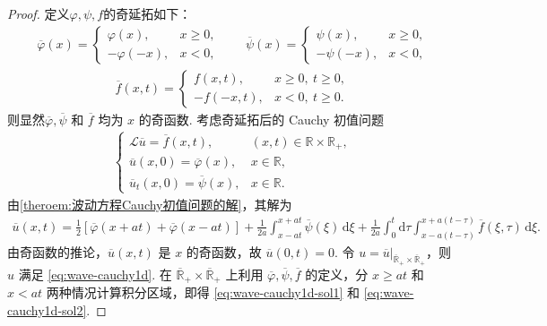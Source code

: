 \documentclass[../../main.tex]{subfiles}%
\begin{document}
\begin{proof}
定义$\varphi,\psi,f$的奇延拓如下：
\begin{align*}
\overline{\varphi}(x)=\begin{cases}
\varphi(x), & x\geqslant 0, \\
-\varphi(-x), & x<0,
\end{cases}\qquad
\overline{\psi}(x)=\begin{cases}
\psi(x), & x\geqslant 0, \\
-\psi(-x), & x<0,
\end{cases}
\end{align*}
\begin{align*}
\overline{f}(x,t)=\begin{cases}
f(x,t), & x\geqslant 0,\ t\geqslant 0, \\
-f(-x,t), & x<0,\ t\geqslant 0.
\end{cases}
\end{align*}
则显然$\overline{\varphi},\overline{\psi}$ 和 $\overline{f}$ 均为 $x$ 的奇函数.
考虑奇延拓后的 Cauchy 初值问题
\begin{align*}
\begin{cases}
\mathcal{L}\overline{u}=\overline{f}(x,t), & (x,t)\in\mathbb{R}\times\mathbb{R}_+, \\
\overline{u}(x,0)=\overline{\varphi}(x), & x\in\mathbb{R}, \\
\overline{u}_t(x,0)=\overline{\psi}(x), & x\in\mathbb{R}.
\end{cases}
\end{align*}
由\cref{theroem:波动方程Cauchy初值问题的解}，其解为
\begin{align*}
\overline{u}(x,t)=\frac{1}{2}[\overline{\varphi}(x+at)+\overline{\varphi}(x-at)]+\frac{1}{2a}\int_{x-at}^{x+at}\overline{\psi}(\xi)\,\mathrm{d}\xi 
+\frac{1}{2a}\int_0^t\mathrm{d}\tau\int_{x-a(t-\tau)}^{x+a(t-\tau)}\overline{f}(\xi,\tau)\,\mathrm{d}\xi.
\end{align*}
由奇函数的推论，$\overline{u}(x,t)$ 是 $x$ 的奇函数，故 $\overline{u}(0,t)=0$. 令 $u=\overline{u}|_{\overline{\mathbb{R}}_+\times\overline{\mathbb{R}}_+}$，则 $u$ 满足 \eqref{eq:wave-cauchy1d}. 在 $\overline{\mathbb{R}}_+\times\overline{\mathbb{R}}_+$ 上利用 $\overline{\varphi},\overline{\psi},\overline{f}$ 的定义，分 $x\geqslant at$ 和 $x<at$ 两种情况计算积分区域，即得 \eqref{eq:wave-cauchy1d-sol1} 和 \eqref{eq:wave-cauchy1d-sol2}.
\end{proof}
\end{document}
